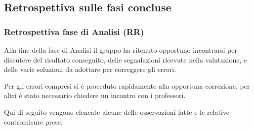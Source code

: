 \subsection{Retrospettiva sulle fasi concluse}
\label{sub:retrospettiva}

\subsubsection{Retrospettiva fase di Analisi (RR)}
\label{par:retrospettiva-RR}
Alla fine della fase di Analisi il gruppo ha ritenuto opportuno incontrarsi per discutere del risultato conseguito, delle segnalazioni ricevute nella valutazione, e delle varie soluzioni da adottare per correggere gli errori.

Per gli errori compresi si è proceduto rapidamente alla opportuna correzione, per altri è stato necessario chiedere un incontro
con i professori.

Qui di seguito vengono elencate alcune delle osservazioni fatte e le relative contromisure prese.


